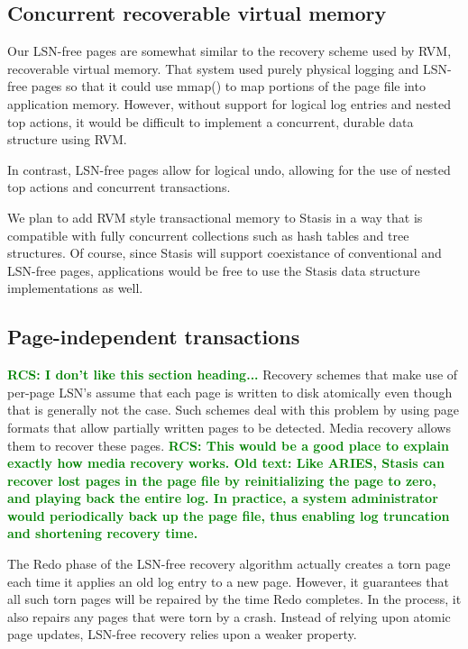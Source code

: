 \documentclass[letterpaper,twocolumn,10pt]{article}
\newcommand{\yad}{Stasis\xspace}
\newcommand{\rcs}[1]{\textcolor{green}{\bf RCS: #1}}
\begin{document}
\subsection{Concurrent recoverable virtual memory}

Our LSN-free pages are somewhat similar to the recovery scheme used by
RVM, recoverable virtual memory.  That system used purely physical
logging and LSN-free pages so that it could use mmap() to map portions
of the page file into application memory\cite{lrvm}.  However, without
support for logical log entries and nested top actions, it would be
difficult to implement a concurrent, durable data structure using RVM.

In contrast, LSN-free pages allow for logical undo, allowing for the
use of nested top actions and concurrent transactions.

We plan to add RVM style transactional memory to \yad in a way that is
compatible with fully concurrent collections such as hash tables and
tree structures.  Of course, since \yad will support coexistance of
conventional and LSN-free pages, applications would be free to use the
\yad data structure implementations as well.

\subsection{Page-independent transactions}
\rcs{I don't like this section heading...}  Recovery schemes that make
use of per-page LSN's assume that each page is written to disk
atomically even though that is generally not the case.  Such schemes
deal with this problem by using page formats that allow partially
written pages to be detected.  Media recovery allows them to recover
these pages.  \rcs{This would be a good place to explain exactly how media recovery works.  Old text: Like ARIES, \yad can recover lost pages in the page
file by reinitializing the page to zero, and playing back the entire
log.  In practice, a system administrator would periodically back up
the page file, thus enabling log truncation and shortening recovery
time.}

The Redo phase of the LSN-free recovery algorithm actually creates a
torn page each time it applies an old log entry to a new page.
However, it guarantees that all such torn pages will be repaired by
the time Redo completes.  In the process, it also repairs any pages
that were torn by a crash.  Instead of relying upon atomic page
updates, LSN-free recovery relies upon a weaker property.
\end{document}

